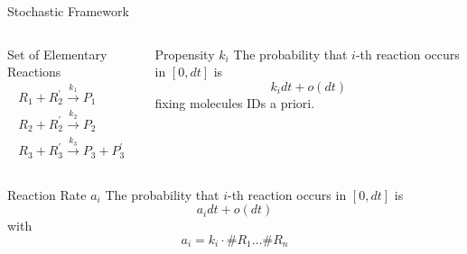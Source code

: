 \documentclass{beamer}
\begin{document}
\begin{frame}{Stochastic Framework}
  \begin{columns}
    \begin{column}{.45 \textwidth}
      \begin{block}{Set of Elementary Reactions}
        \begin{equation*}
          \begin{gathered}
            R_1 + R^\prime_2 \xrightarrow{k_1} P_1 \\
            R_2 + R^\prime_2 \xrightarrow{k_2} P_2 \\
            R_3 + R_3^\prime \xrightarrow{k_3} P_3 + P_3^\prime 
          \end{gathered}
        \end{equation*}
      \end{block}
    \end{column} 
    \begin{column}{.45 \textwidth}
      \begin{block}{Propensity $k_i$}
        The probability that $i$-th reaction occurs
        in  $[0, dt]$ is
        $$k_i dt + o(dt)$$
        fixing molecules IDs a priori.
      \end{block}
    \end{column}
  \end{columns}
  \begin{block}{Reaction Rate $a_i$}
    The probability that $i$-th reaction occurs
    in  $[0, dt]$ is
    $$a_i dt + o(dt)$$
    with
    $$ a_i = k_i \cdot \# R_1 \dots \#R_n$$
  \end{block}
\end{frame}
\end{document}
